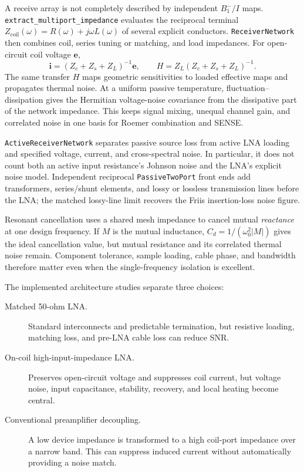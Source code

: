 \documentclass[11pt,oneside]{report}
\newcommand{\code}[1]{\texttt{#1}}
\begin{document}
A receive array is not completely described by independent \(B_1^-/I\) maps.
\code{extract\_multiport\_impedance} evaluates the reciprocal terminal
\(Z_{\mathrm{coil}}(\omega)=R(\omega)+j\omega L(\omega)\) of several explicit
conductors. \code{ReceiverNetwork} then combines coil, series tuning or
matching, and load impedances. For open-circuit coil voltage \(\mathbf e\),
\[
 \mathbf i=(Z_c+Z_s+Z_L)^{-1}\mathbf e,
 \qquad
 H=Z_L(Z_c+Z_s+Z_L)^{-1}.
\]
The same transfer \(H\) maps geometric sensitivities to loaded effective maps
and propagates thermal noise. At a uniform passive temperature,
fluctuation--dissipation gives the Hermitian voltage-noise covariance from the
dissipative part of the network impedance. This keeps signal mixing, unequal
channel gain, and correlated noise in one basis for Roemer combination and
SENSE.

\code{ActiveReceiverNetwork} separates passive source loss from active LNA
loading and specified voltage, current, and cross-spectral noise. In particular,
it does not count both an active input resistance's Johnson noise and the
LNA's explicit noise model. Independent reciprocal \code{PassiveTwoPort}
front ends add transformers, series/shunt elements, and lossy or lossless
transmission lines before the LNA; the matched lossy-line limit recovers the
Friis insertion-loss noise figure.

Resonant cancellation uses a shared mesh impedance to cancel mutual
\emph{reactance} at one design frequency. If \(M\) is the mutual inductance,
\(C_d=1/(\omega_0^2|M|)\) gives the ideal cancellation value, but mutual
resistance and its correlated thermal noise remain. Component tolerance,
sample loading, cable phase, and bandwidth therefore matter even when the
single-frequency isolation is excellent.

The implemented architecture studies separate three choices:
\begin{description}
 \item[Matched 50-ohm LNA.] Standard interconnects and predictable termination,
 but resistive loading, matching loss, and pre-LNA cable loss can reduce SNR.
 \item[On-coil high-input-impedance LNA.] Preserves open-circuit voltage and
 suppresses coil current, but voltage noise, input capacitance, stability,
 recovery, and local heating become central.
 \item[Conventional preamplifier decoupling.] A low device impedance is
 transformed to a high coil-port impedance over a narrow band. This can suppress
 induced current without automatically providing a noise match.
\end{description}
\end{document}
